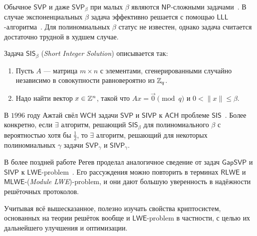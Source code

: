 Обычное $\mathsf{SVP}$ и даже $\mathsf{SVP}_\beta$ при малых $\beta$ являются $\mathsf{NP}$-сложными задачами~\cite{SVP_hard}. В случае экспоненциальных $\beta$ задача эффективно решается с помощью $\mathsf{LLL}$-алгоритма~\cite{LLL}. Для полиномиальных $\beta$ статус не известен, однако задача считается достаточно трудной в худшем случае.

Задача $\mathsf{SIS}_\beta$ ({\it Short Integer Solution}) описывается так:
\begin{enumerate}
	\item Пусть $A$ --- матрица $m \times n$ с элементами, сгенерированными случайно независимо в совокупности равновероятно из $\mathbb{Z}_q$.
	\item Надо найти вектор $x \in \mathbb{Z}^n$, такой что $Ax = \vec 0 \pmod q$ и $0 < \|x\| \leq \beta$.
\end{enumerate}

В $1996$ году Ажтай свёл $\mathsf{WCH}$ задачи $\mathsf{SVP}$ и $\mathsf{SIVP}$ к $\mathsf{ACH}$ проблеме $\mathsf{SIS}$~\cite{ACH_Ajtai}. Более конкретно, если $\exists$ алгоритм, решающий $\mathsf{SIS}_\beta$ для полиномиального $\beta$ с вероятностью хотя бы $\frac12$, то $\exists$ алгоритм, решающий для некоторых полиномиальных $\gamma$ задачи $\mathsf{SVP_\gamma}$ и $\mathsf{SIVP_\gamma}$.

В более поздней работе Регев проделал аналогичное сведение от задач $\mathsf{GapSVP}$ и $\mathsf{SIVP}$ к $\mathsf{LWE}$-problem~\cite{LWE}. Его рассуждения можно повторить в терминах $\mathsf{RLWE}$ и $\mathsf{MLWE}$-({\it Module LWE})-problem, и они дают большую уверенность в надёжности решёточных протоколов.

Учитывая всё вышесказанное, полезно изучать свойства криптосистем, основанных на теории решёток вообще и $\mathsf{LWE}$-problem в частности, с целью их дальнейшего улучшения и оптимизации.

